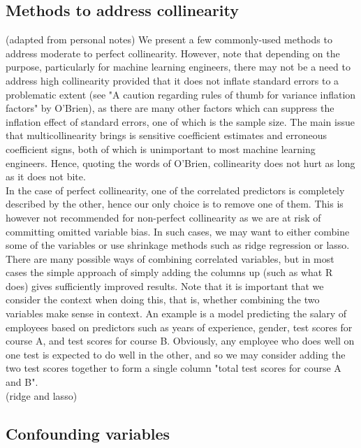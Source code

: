 \documentclass[12pt]{article}
\begin{document}
	\subsection{Methods to address collinearity}
	
	(adapted from personal notes) We present a few commonly-used methods to address moderate to perfect collinearity. However, note that depending on the purpose, particularly for machine learning engineers, there may not be a need to address high collinearity provided that it does not inflate standard errors to a problematic extent (see "A caution regarding rules of thumb for variance inflation factors" by O'Brien), as there are many other factors which can suppress the inflation effect of standard errors, one of which is the sample size. The main issue that multicollinearity brings is sensitive coefficient estimates and erroneous coefficient signs, both of which is unimportant to most machine learning engineers. Hence, quoting the words of O'Brien, collinearity does not hurt as long as it does not bite.\\
	
	In the case of perfect collinearity, one of the correlated predictors is completely described by the other, hence our only choice is to remove one of them. This is however not recommended for non-perfect collinearity as we are at risk of committing omitted variable bias. In such cases, we may want to either combine some of the variables or use shrinkage methods such as ridge regression or lasso.\\
	
	There are many possible ways of combining correlated variables, but in most cases the simple approach of simply adding the columns up (such as what R does) gives sufficiently improved results. Note that it is important that we consider the context when doing this, that is, whether combining the two variables make sense in context. An example is a model predicting the salary of employees based on predictors such as years of experience, gender, test scores for course A, and test scores for course B. Obviously, any employee who does well on one test is expected to do well in the other, and so we may consider adding the two test scores together to form a single column "total test scores for course A and B".\\
	
	(ridge and lasso)
	
	
	
	\subsection{Confounding variables}
	
\end{document}
